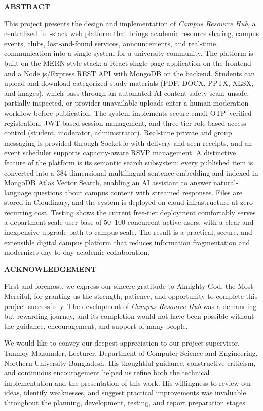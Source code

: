 \documentclass[12pt,a4paper]{report}
\newcommand{\SupervisorName}{Tanmoy Mazumder}
\newcommand{\SupervisorRank}{Lecturer}
\newcommand{\frontheading}[1]{%
  \begin{center}\textbf{\Large #1}\end{center}\vspace{10pt}}
\begin{document}
\frontheading{ABSTRACT}
This project presents the design and implementation of
\textit{Campus Resource Hub}, a centralized full-stack web platform
that brings academic resource sharing, campus events, clubs,
lost-and-found services, announcements, and real-time communication
into a single system for a university community. The platform is
built on the MERN-style stack: a React single-page application on
the frontend and a Node.js/Express REST API with MongoDB on the
backend. Students can upload and download categorized study
materials (PDF, DOCX, PPTX, XLSX, and images), which pass through an
automated AI content-safety scan; unsafe, partially inspected, or
provider-unavailable uploads enter a human moderation workflow before
publication. The system implements secure email-OTP--verified
registration, JWT-based session management, and three-tier
role-based access control (student, moderator, administrator).
Real-time private and group messaging is provided through
Socket.io with delivery and seen receipts, and an event scheduler
supports capacity-aware RSVP management. A distinctive feature of
the platform is its semantic search subsystem: every published item
is converted into a 384-dimensional multilingual sentence embedding
and indexed in MongoDB Atlas Vector Search, enabling an AI assistant
to answer natural-language questions about campus content with
streamed responses. Files are stored in Cloudinary, and the system
is deployed on cloud infrastructure at zero recurring cost. Testing
shows the current free-tier deployment comfortably serves a
department-scale user base of 50--100 concurrent active users, with
a clear and inexpensive upgrade path to campus scale. The result is
a practical, secure, and extensible digital campus platform that
reduces information fragmentation and modernizes day-to-day academic
collaboration.
\clearpage

\frontheading{ACKNOWLEDGEMENT}
First and foremost, we express our sincere gratitude to Almighty God,
the Most Merciful, for granting us the strength, patience, and
opportunity to complete this project successfully. The development of
\textit{Campus Resource Hub} was a demanding but rewarding journey,
and its completion would not have been possible without the guidance,
encouragement, and support of many people.

We would like to convey our deepest appreciation to our project
supervisor, \SupervisorName, \SupervisorRank, Department of Computer
Science and Engineering, Northern University Bangladesh. His
thoughtful guidance, constructive criticism, and continuous
encouragement helped us refine both the technical implementation and
the presentation of this work. His willingness to review our ideas,
identify weaknesses, and suggest practical improvements was
invaluable throughout the planning, development, testing, and report
preparation stages.
\end{document}
